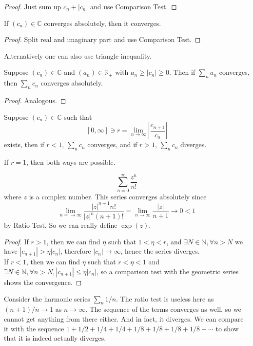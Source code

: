 \begin{proof}
    Just sum up $c_n+|c_n|$ and use Comparison Test.
\end{proof}
\begin{theorem}
    If $(c_n)\in\mathbb C$ converges absolutely, then it converges.
\end{theorem}
\begin{proof}
    Split real and imaginary part and use Comparison Test.
\end{proof}
Alternatively one can also use triangle inequality.
\begin{theorem}
    Suppose $(c_n)\in\mathbb C$ and $(a_n)\in\mathbb R_+$ with $a_n\ge |c_n|\ge 0$.
    Then if $\sum_na_n$ converges, then $\sum_nc_n$ converges absolutely.
\end{theorem}
\begin{proof}
    Analogous.
\end{proof}
\begin{theorem}
    Suppose $(c_n)\in\mathbb C$ such that
    $$[0,\infty]\ni r=\lim_{n\to\infty}\left|\frac{c_{n+1}}{c_n}\right|$$
    exists, then if $r<1$, $\sum_{n}c_n$ converges, and if $r>1$, $\sum_nc_n$ diverges.
\end{theorem}
If $r=1$, then both ways are possible.
\begin{example}
    $$\sum_{n=0}^\infty\frac{z^n}{n!}$$
    where $z$ is a complex number.
    This series converges absolutely since
    $$\lim_{n=\to\infty}\frac{|z|^{n+1}n!}{|z|^n(n+1)!}=\lim_{n\to\infty} \frac{|z|}{n+1}\to 0<1$$
    by Ratio Test.
    So we can really define $\exp(z)$.
\end{example}
\begin{proof}
    If $r>1$, then we can find $\eta$ such that $1<\eta<r$, and $\exists N\in\mathbb N,\forall n>N$ we have $|c_{n+1}|>\eta|c_n|$, therefore $|c_n|\to\infty$, hence the series diverges.\\
    If $r<1$, then we can find $\eta$ such that $r<\eta<1$ and $\exists N\in\mathbb N,\forall n>N,|c_{n+1}|\le\eta|c_n|$, so a comparison test with the geometric series shows the convergence. 
\end{proof}
\begin{example}
    Consider the harmonic series $\sum_n1/n$.
    The ratio test is useless here as $(n+1)/n\to 1$ as $n\to\infty$.
    The sequence of the terms converges as well, so we cannot get anything from there either.
    And in fact, it diverges.
    We can compare it with the sequence $1+1/2+1/4+1/4+1/8+1/8+1/8+1/8+\cdots$ to show that it is indeed actually diverges.
\end{example}
